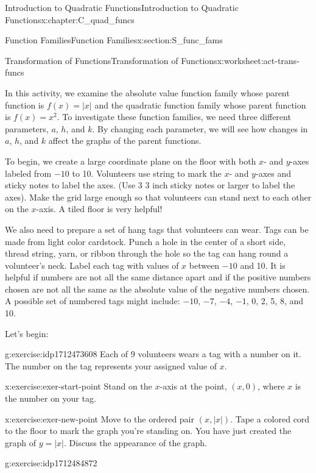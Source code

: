 \documentclass[oneside,10pt,]{book}
\numberwithin{equation}{chapter}
\begin{document}
\begin{chapterptx}{Introduction to Quadratic Functions}{}{Introduction to Quadratic Functions}{}{}{x:chapter:C_quad_funcs}
\begin{sectionptx}{Function Families}{}{Function Families}{}{}{x:section:S_func_fams}
\begin{worksheet-subsection}{Transformation of Functions}{}{Transformation of Functions}{}{}{x:worksheet:act-trans-funcs}
\begin{introduction}{}%
In this activity, we examine the absolute value function family whose parent function is \(f(x) = |x|\) and the quadratic function family whose parent function is \(f(x) = x^2\). To investigate these function families, we need three different parameters, \(a\), \(h\), and \(k\). By changing each parameter, we will see how changes in \(a\), \(h\), and \(k\) affect the graphs of the parent functions.%
\par
To begin, we create a large coordinate plane on the floor with both \(x\)- and \(y\)-axes labeled from \(-10\) to 10. Volunteers use string to mark the \(x\)- and \(y\)-axes and sticky notes to label the axes. (Use 3 \texttimes{} 3 inch sticky notes or larger to label the axes). Make the grid large enough so that volunteers can stand next to each other on the \(x\)-axis. A tiled floor is very helpful!%
\par
We also need to prepare a set of hang tags that volunteers can wear. Tags can be made from light color cardstock. Punch a hole in the center of a short side, thread string, yarn, or ribbon through the hole so the tag can hang round a volunteer's neck. Label each tag with values of \(x\) between \(-10\) and 10. It is helpful if numbers are not all the same distance apart and if the positive numbers chosen are not all the same as the absolute value of the negative numbers chosen. A possible set of numbered tags might include: \(-10\), \(-7\), \(-4\), \(-1\), 0, 2, 5, 8, and 10.%
\par
Let's begin:%
\end{introduction}%
\begin{divisionexercise}{1}{}{}{g:exercise:idp1712473608}%
Each of 9 volunteers wears a tag with a number on it. The number on the tag represents your assigned value of \(x\).%
\end{divisionexercise}%
\begin{divisionexercise}{2}{}{}{x:exercise:exer-start-point}%
Stand on the \(x\)-axis at the point, \((x, 0)\), where \(x\) is the number on your tag.%
\end{divisionexercise}%
\begin{divisionexercise}{3}{}{}{x:exercise:exer-new-point}%
Move to the ordered pair \((x, |x|)\). Tape a colored cord to the floor to mark the graph you're standing on. You have just created the graph of \(y = |x|\). Discuss the appearance of the graph.%
\end{divisionexercise}%
\begin{divisionexercise}{4}{}{}{g:exercise:idp1712484872}%

\end{divisionexercise}
\end{worksheet-subsection}
\end{sectionptx}
\end{chapterptx}
\end{document}
